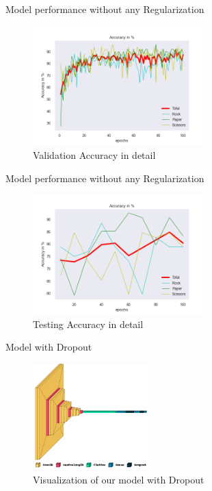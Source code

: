 \documentclass[aspectratio=169]{beamer}
\begin{document}
{    \begin{frame}{Model performance without any Regularization}
        \begin{figure}
            \centering
            \includegraphics[width=0.6\textwidth]{img/baptiste_100epoches_accuracy__Dropouts_False__BatchNorm_False.png}
            \caption{Validation Accuracy in detail}
        \end{figure}
    \end{frame}

    \begin{frame}{Model performance without any Regularization}
        \begin{figure}
            \centering
            \includegraphics[width=0.6\textwidth]{img/baptiste_100_epoches_test_accuracy__Dropouts_False__BatchNorm_False.png}
            \caption{Testing Accuracy in detail}
        \end{figure}
    \end{frame}

    
    \begin{frame}{Model with Dropout}
        \begin{figure}
            \centering
            \includegraphics[width=0.4\textwidth]{img/model_dropout_true_batchnorm_false.png}
            \caption{Visualization of our model with Dropout}
        \end{figure}
    \end{frame}


}
\end{document}

